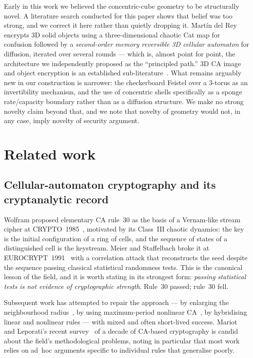 \documentclass[11pt,a4paper]{article}
\theoremstyle{plain}
\theoremstyle{definition}
\theoremstyle{remark}
\begin{document}
Early in this work we believed the concentric-cube geometry to be structurally novel.
A literature search conducted for this paper shows that belief was too strong, and we
correct it here rather than quietly dropping it. Martín del Rey~\cite{rey2015}
encrypts 3D solid objects using a three-dimensional chaotic Cat map for confusion
followed by a \emph{second-order memory reversible 3D cellular automaton} for
diffusion, iterated over several rounds --- which is, almost point for point, the
architecture we independently proposed as the ``principled path.'' 3D CA image and
object encryption is an established sub-literature~\cite{rey2015,chen2004,3dca2016,carev2026}.
What remains arguably new in our construction is narrower: the checkerboard Feistel
over a 3-torus as an invertibility mechanism, and the use of concentric shells
specifically as a sponge rate/capacity boundary rather than as a diffusion structure.
We make no strong novelty claim beyond that, and we note that novelty of geometry
would not, in any case, imply novelty of security argument.

\section{Related work}
\label{sec:related}

\subsection{Cellular-automaton cryptography and its cryptanalytic record}

Wolfram proposed elementary CA rule~30 as the basis of a Vernam-like stream cipher at
CRYPTO~1985~\cite{wolfram85}, motivated by its Class~III chaotic dynamics: the key is
the initial configuration of a ring of cells, and the sequence of states of a
distinguished cell is the keystream. Meier and Staffelbach broke it at
EUROCRYPT~1991~\cite{meier91} with a correlation attack that reconstructs the seed
despite the sequence passing classical statistical randomness tests. This is the
canonical lesson of the field, and it is worth stating in its strongest form:
\emph{passing statistical tests is not evidence of cryptographic strength}. Rule~30
passed; rule~30 fell.

Subsequent work has attempted to repair the approach --- by enlarging the
neighbourhood radius~\cite{4nbr}, by using maximum-period nonlinear
CA~\cite{maiti17}, by hybridising linear and nonlinear rules --- with mixed and often
short-lived success. Mariot and Leporati's recent survey~\cite{camariot} of a decade
of CA-based cryptography is candid about the field's methodological problems, noting
in particular that most work relies on ad~hoc arguments specific to individual rules
that generalise poorly.
\end{document}
